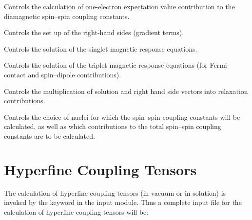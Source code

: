 \begin{list}{}{\itemsep 0.10cm \parsep 0.0cm}
\item[\Sec{EXPECT}] Controls the calculation of one-electron
expectation value contribution to the diamagnetic spin--spin coupling
constants.
\item[\Sec{GETSGY}] Controls the set up of the right-hand sides
(gradient terms).
\item[\Sec{LINRES}] Controls the solution of the singlet magnetic
response equations.
\item[\Sec{TRPRSP}] Controls the solution of the triplet magnetic
response equations (for Fermi-contact and spin--dipole contributions).
\item[\Sec{RELAX}] Controls the multiplication of solution and right hand
side vectors into relaxation contributions.
\item[\Sec{SPIN-S}] Controls the choice of nuclei for which the
spin--spin coupling constants will be calculated, as well as which
contributions to the total spin--spin coupling constants are to be
calculated.
\end{list}

\section{Hyperfine Coupling Tensors}

\begin{center}
\end{center}

    The calculation of hyperfine coupling tensors (in vacuum or in
solution) is invoked by the keyword  in the 
input module. Thus a complete input file for the calculation of
hyperfine coupling tensors will be:

